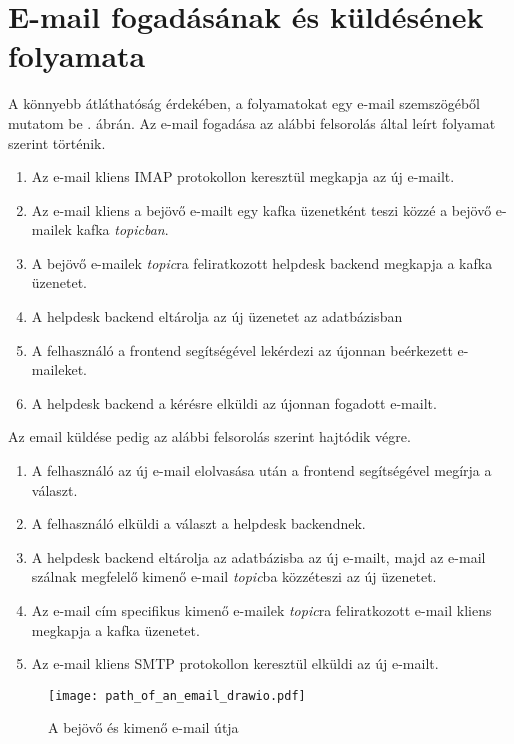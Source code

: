 \section{E-mail fogadásának és küldésének folyamata}
A könnyebb átláthatóság érdekében, a folyamatokat egy e-mail szemszögéből mutatom be . ábrán. Az e-mail fogadása az alábbi felsorolás által leírt folyamat szerint történik.
\begin{enumerate}
	\item Az e-mail kliens IMAP protokollon keresztül megkapja az új e-mailt.
	\item Az e-mail kliens a bejövő e-mailt egy kafka üzenetként teszi közzé a bejövő e-mailek kafka \textit{topicban}.
	\item A bejövő e-mailek \textit{topic}ra feliratkozott helpdesk backend megkapja a kafka üzenetet.
	\item A helpdesk backend eltárolja az új üzenetet az adatbázisban
	\item A felhasználó a frontend segítségével lekérdezi az újonnan beérkezett e-maileket.
	\item A helpdesk backend a kérésre elküldi az újonnan fogadott e-mailt.
\end{enumerate}

\bigskip
Az email küldése pedig az alábbi felsorolás szerint hajtódik végre.
\begin{enumerate}
	\item A felhasználó az új e-mail elolvasása után a frontend segítségével megírja a választ.
	\item A felhasználó elküldi a választ a helpdesk backendnek.
	\item A helpdesk backend eltárolja az adatbázisba az új e-mailt, majd az e-mail szálnak megfelelő kimenő e-mail \textit{topic}ba közzéteszi az új üzenetet.
	\item Az e-mail cím specifikus kimenő e-mailek \textit{topic}ra feliratkozott e-mail kliens megkapja a kafka üzenetet.
	\item Az e-mail kliens SMTP protokollon keresztül elküldi az új e-mailt.
\end{enumerate}


\begin{figure}[hbt] 
	\centering
	\texttt{[image: path\_of\_an\_email\_drawio.pdf]}
	\caption{A bejövő és kimenő e-mail útja}
	\label{fig:path_of_an_email}
\end{figure}
